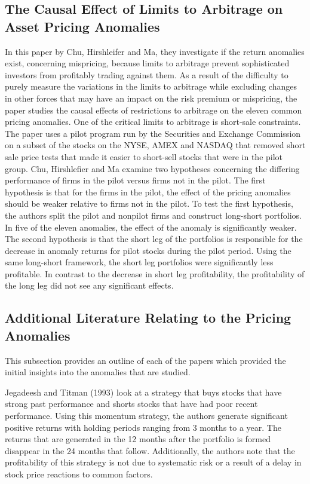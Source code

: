 \documentclass[a4paper]{article}                 %
\begin{document}
\subsection{The Causal Effect of Limits to Arbitrage on Asset Pricing Anomalies}
In this paper by Chu, Hirshleifer and Ma, they investigate if the return anomalies exist, concerning mispricing, because limits to arbitrage prevent sophisticated investors from profitably trading against them. As a result of the difficulty to purely measure the variations in the limits to arbitrage while excluding changes in other forces that may have an impact on the risk premium or mispricing, the paper studies the causal effects of restrictions to arbitrage on the eleven common pricing anomalies. One of the critical limits to arbitrage is short-sale constraints. The paper uses a pilot program run by the Securities and Exchange Commission on a subset of the stocks on the NYSE, AMEX and NASDAQ that removed short sale price tests that made it easier to short-sell stocks that were in the pilot group. 
Chu, Hirshlefier and Ma examine two hypotheses concerning the differing performance of firms in the pilot versus firms not in the pilot. The first hypothesis is that for the firms in the pilot, the effect of the pricing anomalies should be weaker relative to firms not in the pilot. To test the first hypothesis, the authors split the pilot and nonpilot firms and construct long-short portfolios. In five of the eleven anomalies, the effect of the anomaly is significantly weaker.
The second hypothesis is that the short leg of the portfolios is responsible for the decrease in anomaly returns for pilot stocks during the pilot period. Using the same long-short framework, the short leg portfolios were significantly less profitable. In contrast to the decrease in short leg profitability, the profitability of the long leg did not see any significant effects.

\subsection{Additional Literature Relating to the Pricing Anomalies}
This subsection provides an outline of each of the papers which provided the initial insights into the anomalies that are studied.

Jegadeesh and Titman (1993) look at a strategy that buys stocks that have strong past performance and shorts stocks that have had poor recent performance. Using this momentum strategy, the authors generate significant positive returns with holding periods ranging from 3 months to a year. The returns that are generated in the 12 months after the portfolio is formed disappear in the 24 months that follow. Additionally, the authors note that the profitability of this strategy is not due to systematic risk or a result of a delay in stock price reactions to common factors. 
\end{document}
